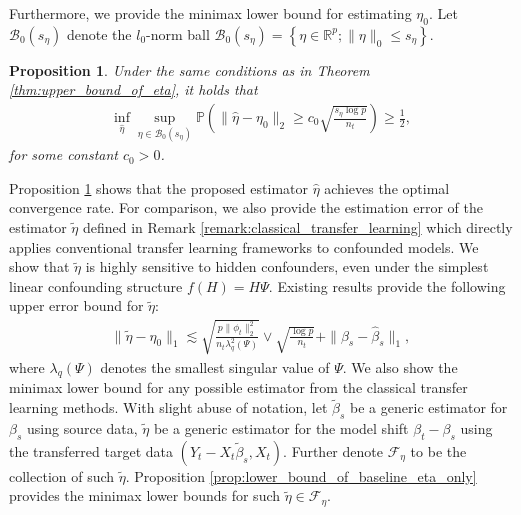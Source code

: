 \documentclass[12pt]{article}
\newtheorem{prop}{Proposition}
\begin{document}
Furthermore, we provide the minimax lower bound for estimating $\eta_0$. Let $\mathcal{B}_0(s_\eta)$ denote the $l_0$-norm ball $\mathcal{B}_0(s_\eta) = \left\{\eta\in\mathbb{R}^p; \|\eta\|_0 \le s_\eta\right\}$. 
\begin{prop}
    \label{prop:lower_bound_of_eta}
    Under the same conditions as in Theorem \ref{thm:upper_bound_of_eta}, it holds that
    \begin{align*}
       \inf_{\hat{\eta}} \sup_{\eta \in \mathcal{B}_0(s_\eta)} \mathbb{P}\left(\|\hat{\eta} - \eta_0\|_2 \ge c_0\sqrt{\frac{s_\eta \log p}{n_t}}\right) \ge \frac{1}{2},
    \end{align*}
    for some constant $c_0>0$. 
\end{prop}

Proposition \ref{prop:lower_bound_of_eta} shows that the proposed estimator $\hat{\eta}$ achieves the optimal convergence rate. For comparison, we also provide the estimation error of the estimator $\tilde{\eta}$ defined in Remark \ref{remark:classical_transfer_learning} which directly applies conventional transfer learning frameworks to confounded models. We show that $\tilde{\eta}$ is highly sensitive to hidden confounders, even under the simplest linear confounding structure $f(H)=H\Psi$. 
 Existing results \citep{cevid2020spectral,guo2022doubly} provide the following upper error bound for $\tilde{\eta}$:
\begin{align*}
    \|\tilde{\eta} - \eta_0\|_1 \lesssim \sqrt{\frac{p\|\phi_t\|_2^2}{n_t\lambda^2_q(\Psi)}}\vee\sqrt{\frac{\log p}{n_t}}  + \|\beta_s - \hat{\beta}_{s}\|_1, 
\end{align*}
 where $\lambda_q(\Psi)$ denotes the smallest singular value of $\Psi$. We also show the minimax lower bound for any possible estimator from the classical transfer learning methods. With slight abuse of notation, let $\tilde{\beta}_s$ be a generic estimator for $\beta_s$ using source data, $\tilde{\eta}$ be a generic estimator for the model shift $\beta_t-\beta_s$ using the transferred target data $(Y_t-X_t\tilde{\beta}_s,X_t)$. Further denote $\mathcal{F}_\eta$ to be the collection of such $\tilde{\eta}$. Proposition \ref{prop:lower_bound_of_baseline_eta_only} provides the minimax lower bounds for such $\tilde{\eta}\in \mathcal{F}_\eta$.
\end{document}
